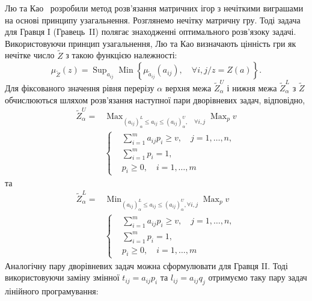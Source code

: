 \documentclass[14pt, a4paper, oneside]{extarticle}
\numberwithin{equation}{section}
\newcommand{\geqslant}{\geq}
\newcommand{\leqslant}{\leq}
\begin{document}
Лю та Као~\cite{Lui} розробили метод розв'язання матричних ігор з нечіткими виграшами на основі принципу узагальнення. Розглянемо нечітку матричну гру. Тоді задача для Гравця I (Гравець~II) полягає знаходженні оптимального розв'язоку задачі. Використовуючи принцип узагальнення, Лю та Као визначають цінність гри як нечітке число $\tilde{Z}$ з такою функцією належності:
\begin{equation*}
\mu_{\tilde{Z}}(z)=\operatorname{Sup}_{a_{i j}} \operatorname{Min}\left\{\mu_{\tilde{a}_{i j}}\left(a_{i j}\right), \quad \forall i, j / z=Z(a)\right\} .
\end{equation*}
Для фіксованого значення рівня перерізу $\alpha$ верхня межа $\tilde{Z}_{\alpha}^{U}$ і нижня межа $\tilde{Z}_{\alpha}^{L} $ з $\tilde{Z}$ обчислюються шляхом розв'язання наступної пари дворівневих задач, відповідно,
\begin{equation*}
\begin{aligned}
\tilde{Z}_\alpha^U= & \operatorname{Max}_{\left(a_{i j}\right)_\alpha^L \leqslant a_{i j} \leqslant\left(a_{i j}\right)_\alpha^U, \quad \forall i, j} \operatorname{Max}_p v \\
& \left\{\begin{aligned}
&\sum_{i=1}^m a_{i j} p_i \geqslant v, \quad j=1, \ldots, n, \\
&\sum_{i=1}^m p_i=1, \\
&p_i \geqslant 0, \quad i=1, \ldots, m
\end{aligned}\right.
\end{aligned}
\end{equation*}
та
\begin{equation*}
\begin{aligned}
\tilde{Z}_\alpha^L= & \operatorname{Min}_{\left(a_{i j}\right)_\alpha^L \leqslant a_{i j} \leqslant\left(a_{i j}\right)_\alpha^U, \forall i, j} \operatorname{Max}_p v \\
& \left\{\begin{aligned}
&\sum_{i=1}^m a_{i j} p_i \geqslant v, \quad j=1, \ldots, n, \\
&\sum_{i=1}^m p_i=1, \\
&p_i \geqslant 0, \quad i=1, \ldots, m 
\end{aligned}\right.
\end{aligned}
\end{equation*}
Аналогічну пару дворівневих задач можна сформулювати для Гравця II. Тоді використовуючи заміну змінної $t_{i j}=a_{i j} p_{i}$ та $l_{i j}=a_{i j} q_{j}$ отримуємо таку пару задач лінійного програмування:
\end{document}
